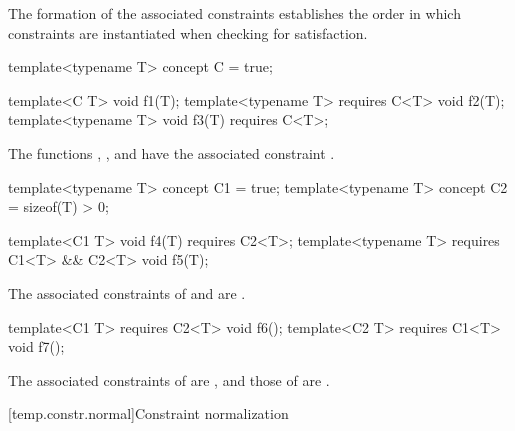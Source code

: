The formation of the associated constraints
establishes the order in which constraints are instantiated when checking
for satisfaction.
\begin{example}
\begin{codeblock}
template<typename T> concept C = true;

template<C T> void f1(T);
template<typename T> requires C<T> void f2(T);
template<typename T> void f3(T) requires C<T>;
\end{codeblock}
The functions , , and  have the associated
constraint .

\begin{codeblock}
template<typename T> concept C1 = true;
template<typename T> concept C2 = sizeof(T) > 0;

template<C1 T> void f4(T) requires C2<T>;
template<typename T> requires C1<T> && C2<T> void f5(T);
\end{codeblock}
The associated constraints of  and 
are .

\begin{codeblock}
template<C1 T> requires C2<T> void f6();
template<C2 T> requires C1<T> void f7();
\end{codeblock}
The associated constraints of
 are ,
and those of
 are .
\end{example}

[temp.constr.normal]{Constraint normalization}
%

